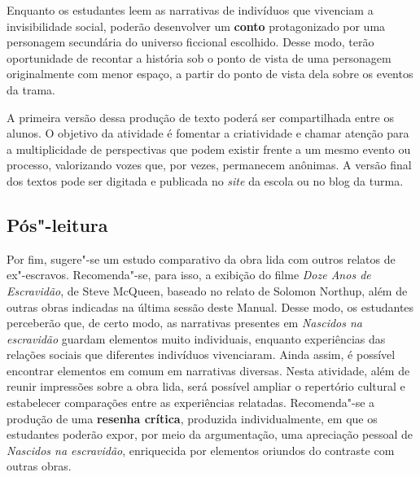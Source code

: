 \documentclass[11pt]{extarticle}
\begin{document}
Enquanto os estudantes leem as narrativas de indivíduos que vivenciam a
invisibilidade social, poderão desenvolver um \textbf{conto}
protagonizado por uma personagem secundária do universo ficcional
escolhido. Desse modo, terão oportunidade de recontar a história sob o
ponto de vista de uma personagem originalmente com menor espaço, a
partir do ponto de vista dela sobre os eventos da trama.

A primeira versão dessa produção de texto poderá ser compartilhada entre
os alunos. O objetivo da atividade é fomentar a criatividade e chamar
atenção para a multiplicidade de perspectivas que podem existir frente a
um mesmo evento ou processo, valorizando vozes que, por vezes,
permanecem anônimas. A versão final dos textos pode ser digitada e
publicada no \emph{site} da escola ou no blog da turma.

\subsection{Pós"-leitura}


Por fim, sugere"-se um estudo comparativo da obra lida com
outros relatos de ex"-escravos. Recomenda"-se, para isso, a exibição do
filme \emph{Doze Anos de Escravidão}, de Steve McQueen, baseado no
relato de Solomon Northup, além de outras obras indicadas na última
sessão deste Manual. Desse modo, os estudantes perceberão que, de certo
modo, as narrativas presentes em \emph{Nascidos na escravidão}
guardam elementos muito individuais, enquanto experiências das relações
sociais que diferentes indivíduos vivenciaram. Ainda assim, é possível
encontrar elementos em comum em narrativas diversas. Nesta atividade,
além de reunir impressões sobre a obra lida, será possível ampliar o
repertório cultural e estabelecer comparações entre as experiências
relatadas. Recomenda"-se a produção de uma \textbf{resenha crítica},
produzida individualmente, em que os estudantes poderão expor, por meio
da argumentação, uma apreciação pessoal de \emph{Nascidos na
escravidão}, enriquecida por elementos oriundos do contraste com outras
obras.

\end{document}
